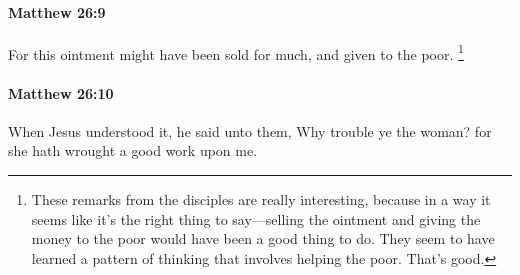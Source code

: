 		\paragraph{Matthew 26:9} %
			\label{MATTHEW-26-9}

			For this ointment might have been sold for much, and given to the poor.%
				\footnote{%
					These remarks from the disciples are really interesting, because in a way it seems like it's the right thing to say---selling the ointment and giving the money to the poor would have been a good thing to do. They seem to have learned a pattern of thinking that involves helping the poor. That's good.
					}

			\begin{framed}
			\scriptsize
				\begin{compactdesc}
					\item[SBLG] 
				\end{compactdesc}
			\end{framed}

		\paragraph{Matthew 26:10} %
			\label{MATTHEW-26-10}

			When Jesus understood it, he said unto them, Why trouble ye the woman? for she hath wrought a good work upon me.

